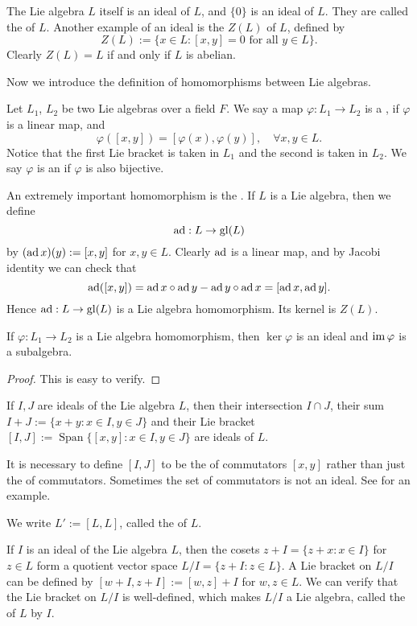 The Lie algebra $L$ itself is an ideal of $L$, and $\{0\}$ is an ideal of $L$. They are called the  of $L$. Another example of an ideal is the  $Z(L)$ of $L$, defined by 
\[
    Z(L):=\{x\in L:[x,y]=0 \mbox{ for all } y\in L\}.
\]
Clearly $Z(L)=L$ if and only if $L$ is abelian.

Now we introduce the definition of homomorphisms between Lie algebras.
\begin{defn}
    Let $L_1$, $L_2$ be two Lie algebras over a field $F$. We say a map $\varphi:L_1\to L_2$ is a , if $\varphi$ is a linear map, and 
    \[
        \varphi([x,y])=[\varphi(x),\varphi(y)],\quad \forall x,y\in L.
    \]
    Notice that the first Lie bracket is taken in $L_1$ and the second is taken in $L_2$. We say $\varphi$ is an  if $\varphi$ is also bijective.
\end{defn}

An extremely important homomorphism is the . If $L$ is a Lie algebra, then we define 
\[
    \operatorname{ad}:L\to \mathrm{gl}(L)
\]
by $(\operatorname{ad} x)(y):=[x,y]$ for $x,y\in L$. Clearly $\operatorname{ad}$ is a linear map, and by Jacobi identity we can check that
\[
    \operatorname{ad}([x,y])=\operatorname{ad} x\circ \operatorname{ad} y-\operatorname{ad} y\circ \operatorname{ad} x=[\operatorname{ad} x,\operatorname{ad} y].
\]
Hence $\operatorname{ad}:L\to \mathrm{gl}(L)$ is a Lie algebra homomorphism. Its kernel is $Z(L)$.

\begin{prop}
    If $\varphi : L_1\to L_2$ is a Lie algebra homomorphism, then $\ker \varphi$ is an ideal and $\operatorname{im} \varphi$ is a subalgebra.
\end{prop}

\begin{proof}
    This is easy to verify.
\end{proof}

If $I,J$ are ideals of the Lie algebra $L$, then their intersection $I\cap J$, their sum $I+J:=\{x+y:x\in I,y\in J\}$ and their Lie bracket $[I,J]:=\operatorname{Span}\{[x,y]:x\in I,y\in J\}$ are ideals of $L$.

\begin{rem}
    It is necessary to define $[I,J]$ to be the  of commutators $[x,y]$ rather than just the  of commutators. Sometimes the set of commutators is not an ideal. See \cite[Exercise 2.14]{Intro_to_Lie_alg} for an example.
\end{rem}

We write $L':=[L,L]$, called the  of $L$.

If $I$ is an ideal of the Lie algebra $L$, then the cosets $z+I=\{z+x:x\in I\}$ for $z\in L$ form a quotient vector space $L/I=\{z+I:z\in L\}$. A Lie bracket on $L/I$ can be defined by $[w+I,z+I]:=[w,z]+I$ for $w,z\in L$. We can verify that the Lie bracket on $L/I$ is well-defined, which makes $L/I$ a Lie algebra, called the  of $L$ by $I$.


